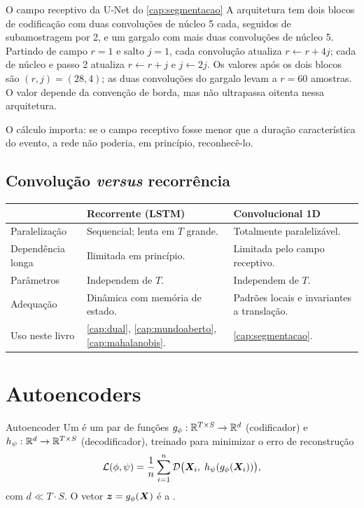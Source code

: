 \begin{exemplo}{O campo receptivo da U-Net do \cref{cap:segmentacao}}
A arquitetura tem dois blocos de codificação com duas convoluções de núcleo 5 cada,
seguidos de subamostragem por 2, e um gargalo com mais duas convoluções de núcleo 5.
Partindo de campo $r=1$ e salto $j=1$, cada convolução atualiza
$r\leftarrow r+4j$; cada  de núcleo e passo 2 atualiza
$r\leftarrow r+j$ e $j\leftarrow2j$. Os valores após os dois blocos são
$(r,j)=(28,4)$; as duas convoluções do gargalo levam a $r=60$ amostras. O valor depende
da convenção de borda, mas não ultrapassa oitenta nessa arquitetura.

O cálculo importa: se o campo receptivo fosse menor que a duração característica do
evento, a rede não poderia, em princípio, reconhecê-lo.
\end{exemplo}

\subsection{Convolução \emph{versus} recorrência}

\begin{center}
\small
\begin{tabular}{p{3.2cm} p{4.7cm} p{4.7cm}}
\toprule
& \textbf{Recorrente (LSTM)} & \textbf{Convolucional 1D} \\
\midrule
Paralelização & Sequencial; lenta em $T$ grande. & Totalmente paralelizável. \\
Dependência longa & Ilimitada em princípio. & Limitada pelo campo receptivo. \\
Parâmetros & Independem de $T$. & Independem de $T$. \\
Adequação & Dinâmica com memória de estado. & Padrões locais e invariantes a
translação. \\
Uso neste livro & \cref{cap:dual}, \cref{cap:mundoaberto},
\cref{cap:mahalanobis}. & \cref{cap:segmentacao}. \\
\bottomrule
\end{tabular}
\end{center}

\section{Autoencoders}

\begin{definicao}{Autoencoder}
Um  é um par de funções
$g_{\phi}: \mathbb{R}^{T \times S} \to \mathbb{R}^{d}$ (codificador) e
$h_{\psi}: \mathbb{R}^{d} \to \mathbb{R}^{T \times S}$ (decodificador), treinado para minimizar o erro
de reconstrução
\begin{equation}
  \mathcal{L}(\phi, \psi) = \frac{1}{n}\sum_{i=1}^{n}
  \mathcal{D}\big( \bm{X}_i,\; h_{\psi}(g_{\phi}(\bm{X}_i)) \big),
  \label{eq:ae}
\end{equation}
com $d \ll T \cdot S$. O vetor $\bm{z} = g_{\phi}(\bm{X})$ é a
.
\end{definicao}

